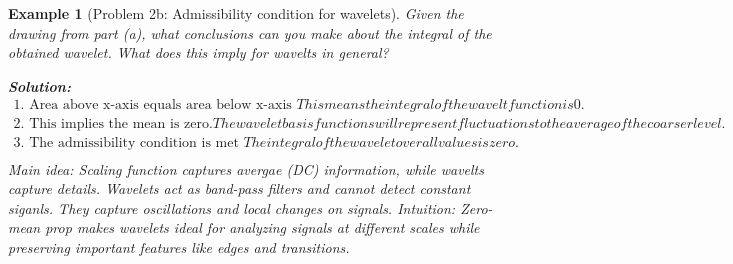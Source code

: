 \documentclass[11pt,a4paper]{article}
\newtheorem{example}[theorem]{Example}
\begin{document}
\begin{example}[Problem 2b: Admissibility condition for wavelets]
    Given the drawing from part (a), what conclusions can you make about the integral of the obtained wavelet. What does this imply for wavelts in general?
    
    \textbf{Solution:}
    \begin{align}
        \text{1. Area above x-axis equals area below x-axis } This means the integral of the wavelt function is 0. \\
        \text{2. This implies the mean is zero.} The wavelet basis functions will represent fluctuations to the average of the coarser level. \\
        \text{3. The admissibility condition is met } The integral of the wavelet over all values is zero. \\
    \end{align}
    Main idea: Scaling function captures avergae (DC) information, while wavelts capture details. Wavelets act as band-pass filters and cannot detect constant siganls. They capture oscillations and local changes on signals.
    Intuition: Zero-mean prop makes wavelets ideal for analyzing signals at different scales while preserving important features like edges and transitions.

\end{example}
\end{document}
